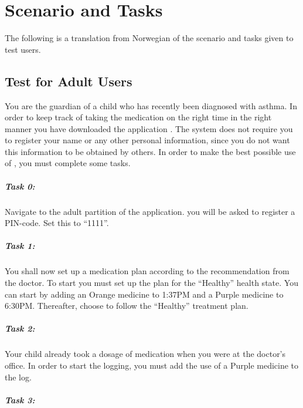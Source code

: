 \chapter{Scenario and Tasks}
\label{app:scenarioandtasks}

The following is a translation from Norwegian of the scenario and tasks given to test users. 

\section{Test for Adult Users}
\label{sec:parentstest}
You are the guardian of a child who has recently been diagnosed with asthma. In order to keep track of taking the medication on the right time in the right manner you have downloaded the application \app{}. The system does not require you to register your name or any other personal information, since you do not want this information to be obtained by others. In order to make the best possible use of \app{}, you must complete some tasks. 

\paragraph{Task 0:}

Navigate to the adult partition of the application. you will be asked to register a PIN-code. Set this to ``1111''.


\paragraph{Task 1:}

You shall now set up a medication plan according to the recommendation from the doctor. To start you must set up the plan for the ``Healthy'' health state. You can start by adding an Orange medicine to 1:37PM and a Purple medicine to 6:30PM. Thereafter, choose to follow the ``Healthy'' treatment plan.


\paragraph{Task 2:}

Your child already took a dosage of medication when you were at the doctor's office. In order to start the logging, you must add the use of a Purple medicine to the log. 


\paragraph{Task 3:}

